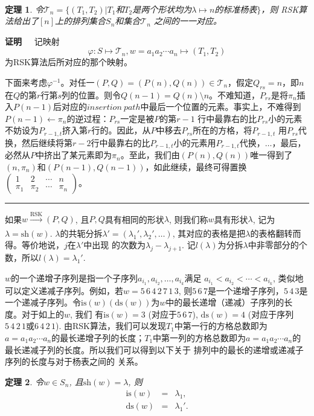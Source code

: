 \documentclass[a4paper,11pt]{article}
\newtheorem{thm}{定理}[section]
\def\qed{\nopagebreak\hfill{\rule{4pt}{7pt}}\medbreak}
\def\pf{{\bf 证明~~ }}
\begin{document}
\\
\\
\\
\\
\\
\\
\\
\\
\\
\\
\\
\begin{thm}
令$\mathcal{T}_{n}=\{(T_{1},
T_{2})|T_{1}$和$T_{2}$是两个形状均为$\lambda\mapsto
n$的标准杨表$\}$，则
RSK算法给出了$[n]$上的排列集合$S_n$和集合$\mathcal{T}_{n}$
之间的一一对应。
\end{thm}
\pf 记映射\[\varphi: S\mapsto \mathcal{T}_{n}, w=a_{1}a_{2}\cdots
a_{n}\mapsto (T_{1}, T_{2})\]为RSK算法后所对应的那个映射。

下面来考虑$\varphi^{-1}$。对任一$(P, Q)=(P(n), Q(n))\in
\mathcal{T}_{n}$，假定$Q_{rs}=n$，即$n$在$Q$的第$r$行第$s$列的位置。则令$Q(n-1)=Q(n)\setminus
n$。不难知道，$P_{rs}$是将$\pi_{n}$插入$P(n-1)$后对应的$insertion\
 path$中最后一个位置的元素。事实上，不难得到$P(n-1)\leftarrow \pi_{n}$的逆过程：$P_{rs}$一定是被$P$的第$r-1$
 行中最靠右的比$P_{rs}$小的元素不妨设为$P_{r-1, t}$挤入第$r$行的。因此，从$P$中移去$P_{rs}$所在的方格，将$P_{r-1, t}$
 用$P_{rs}$代换，然后继续将第$r-2$行中最靠右的比$P_{r-1, t}$小的元素用$P_{r-1, t}$代换，$\ldots$，最后，必然从$P$中挤出了某元素即为$\pi_{n}$。至此，我们由$(P(n), Q(n))$唯一得到了$(n,
\pi_{n})$和$(P(n-1),
Q(n-1))$，如此继续，最终可得置换$\left(\begin{array}{cccc}
1&2&\cdots&n\\\pi_1&\pi_2&\cdots&\pi_n\end{array}\right)$。\qed

如果$w \xrightarrow[]{\text{RSK}}(P,Q)$,
且$P,Q$具有相同的形状$\lambda$, 则我们称$w$具有形状$\lambda$,
记为$\lambda=\mathrm{sh}(w)$.
$\lambda$的共轭分拆$\lambda'=(\lambda_1',\lambda_2',\ldots)$,
其对应的表格是把$\lambda$的表格翻转而得。等价地说，$j$在$\lambda'$中出现
的次数为$\lambda_j-\lambda_{j+1}$.
记$l(\lambda)$为分拆$\lambda$中非零部分的个数，所以$l(\lambda)=\lambda_1'$.

$w$的一个递增子序列是指一个子序列$a_{i_1},a_{i_2},\ldots,a_{i_k}$满足
$a_{i_1}<a_{i_2}<\cdots<a_{i_k}$,
类似地可以定义递减子序列。例如，若$w=5\,6\,4\,2\,7\,1\,3$,
则$5\,6\,7$是一个递增子序列，$5\,4\,3$是一个递减子序列。令$\mathrm{is}(w)
 (\mathrm{ds}(w))$为$w$中的最长递增（递减）子序列的长度。对于如上的$w$, 我们
 有$\mathrm{is}(w) = 3$ (对应于$5\,6\,7$), $\mathrm{ds}(w) =
4$ (对应于序列$5\,4\,2\,1$或$6\,4\,2\,1$).
由RSK算法，我们可以发现$T_{1}$中第一行的方格总数即为$a=a_{1}a_{2}\cdots
a_{n}$的最长递增子列的长度；$T_{1}$中第一列的方格总数即为$a=a_{1}a_{2}\cdots
a_{n}$的最长递减子列的长度。所以我们可以得到以下关于
排列中的最长的递增或递减子序列的长度与对于杨表之间的
关系。
\begin{thm}
令$w \in S_n$, 且$\mathrm{sh}(w)=\lambda$, 则
\begin{eqnarray}
\mathrm{is}(w)&=&\lambda_1,\\
 \mathrm{ds}(w)&=&\lambda_1'.
\end{eqnarray}
\end{thm}
\end{document}
